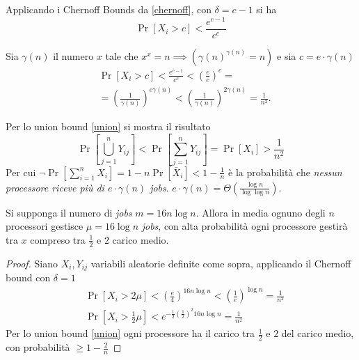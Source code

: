 Applicando i Chernoff Bounds da \ref{chernoff}, con $\delta = c - 1$ si ha
\[
    \Pr[X_i > c] < \frac{e^{c-1}}{c^c}
\]

Sia $\gamma(n)$ il numero $x$ tale che $x^x = n \implies (\gamma(n)^{\gamma(n)} = n)$ e sia $c = e\cdot \gamma(n)$
\begin{align*}
    &\Pr[X_i > c] < \frac{e^{c-1}}{c^c} < \left( \frac{e}{c}\right)^{c} =\\
    &=\left( \frac{1}{\gamma(n)}\right)^{e\gamma(n)} < \left( \frac{1}{\gamma(n)} \right)^{2\gamma(n)} = \frac{1}{n^2}.
\end{align*}

Per lo union bound \ref{union} si mostra il risultato
\[
    \Pr\left[\bigcup_{j = 1}^{n} Y_{ij}\right] < \Pr\left[{\sum_{j=1}^{n}Y_{ij}}\right] = \Pr[X_i] > \frac{1}{n^2}
\]
Per cui $\lnot\Pr{\left[\sum_{i = 1}^nX_i\right]} = 1 - n\Pr\left[ \bar{X}_i  \right] < 1 - \frac{1}{n}$ è la probabilità che \emph{nessun processore riceve più di $e\cdot\gamma(n)$ jobs}. $e\cdot\gamma(n) = \Theta\left(\frac{\log n}{\log \log n} \right)$.

\begin{theorem}
    Si supponga il numero di \emph{jobs} $m = 16 n \log n$. Allora in media ognuno degli $n$ processori gestisce $\mu = 16 \log n$ \emph{jobs}, con alta probabilità ogni processore gestirà tra $x$ compreso tra $\frac{1}{2}$ e $2$ carico medio.
\end{theorem}

\begin{proof}
    Siano $X_{i}, Y_{ij}$ variabili aleatorie definite come sopra, applicando il Chernoff bound con $\delta = 1$
    \begin{align*}
        &\Pr[X_i > 2\mu] < \left( \frac{e}{4}\right)^{16 n \log n} < \left( \frac{1}{e}\right)^{\log n} = \frac{1}{n^2}\\
        &\Pr\left[X_i > \frac{1}{2}\mu\right] < e^{-\frac{1}{2}\left(\frac{1}{2}\right)^2{16 n \log n}} = \frac{1}{n^2} 
    \end{align*}
    Per lo union bound \ref{union} ogni processore ha il carico tra $\frac{1}{2}$ e $2$ del carico medio, con probabilità $\geq 1- \frac{2}{n}$
\end{proof}